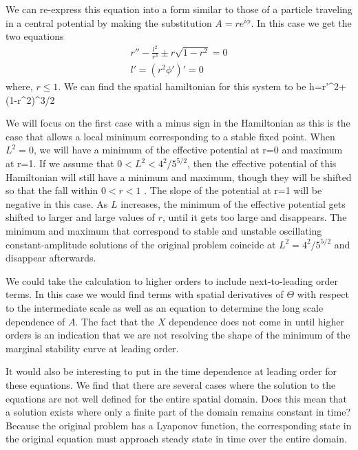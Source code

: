 \documentclass[../main/WavelengthCompetition.tex]{subfiles}
\begin{document}
We can re-express this equation into a form similar to those of a particle traveling in a central potential by making the substitution $A=r e^{i\phi}$. In this case we get the two equations
\begin{subequations}
\begin{align}
r''- \frac{l^2}{r^3}\pm r\sqrt{1-r^2}=0\\
l'=(r^2 \phi')'=0
\end{align}
\end{subequations}
where, $r\leq 1$.  We can find the spatial hamiltonian for this system to be
\beqn
h=r'^2+\mp {}(1-r^2)^{3/2}
\eeqn
 
We will focus on the first case with a minus sign in the Hamiltonian as this is the case that allows a local minimum corresponding to a stable fixed point.  When $L^2=0$, we will have a minimum of the effective potential at r=0 and maximum at r=1.  If we assume that $0<L^2< 4^2/5^{5/2}$, then the effective potential of this Hamiltonian will still have a minimum and maximum, though they will be shifted so that the fall within $0<r<1$ .  The slope of the potential at r=1 will be negative in this case.  As $L$ increases, the minimum of the effective potential gets shifted to larger and large values of $r$, until it gets too large and disappears.  The minimum and maximum that correspond to stable and unstable oscillating constant-amplitude solutions of the original problem coincide at $L^2=4^2/5^{5/2}$ and disappear afterwards. 

We could take the calculation to higher orders to include next-to-leading order terms.  In this case we would find terms with spatial derivatives of $\Theta$ with respect to the intermediate scale as well as an equation to determine the long scale dependence of $A$.  The fact that the $X$ dependence does not come in until higher orders is an indication that we are not resolving the shape of the minimum of the marginal stability curve at leading order.  

It would also be interesting to put in the time dependence at leading order for these equations.  We find that there are several cases where the solution to the equations are not well defined for the entire spatial domain.  Does this mean that a solution exists where only a finite part of the domain remains constant in time?  Because the original problem has a Lyaponov function, the corresponding state in the original equation must approach steady state in time over the entire domain. 
\end{document}
